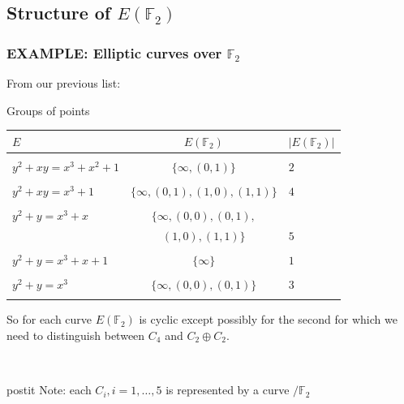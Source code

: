 \documentclass[10pt,handout]{beamer}%
\newcommand{\F}{\mathbb F}
\theoremstyle{definition}
\begin{document}
\subsection{Structure of \texorpdfstring{$E(\F_2)$}{E(F2)}}
\begin{frame}
\frametitle{EXAMPLE: Elliptic curves over $\F_2$}

From our previous list:
\begin{block}{Groups of points}
\begin{tabular}{|l|c|l|}
\hline
 $E$ & $E(\F_2)$ & $|E(\F_2)|$\\
\hline
&&\\
 $y^2+xy=x^3+x^2+1$ & $\{\infty,(0,1)\}$& $2$\\
&&\\
$y^2+xy=x^3+1$ & $\{\infty,(0,1),(1,0),(1,1)\}$ & $4$\\
&&\\
$y^2+y=x^3+x$&$\{\infty,(0,0),(0,1),$ &\\ &$(1,0),(1,1)\}$&$5$\\
&&\\
 $y^2+y=x^3+x+1$ &$\{\infty\}$&$1$\\
&&\\
$y^2+y=x^3$ & $\{\infty,(0,0), (0,1)\}$ & $3$ \\
&&\\\hline
\end{tabular}
\end{block}
\pause
So for each curve $E(\F_2)$ is cyclic except possibly for the second for which we need to distinguish between
$C_4$ and $C_2\oplus C_2$.\pause

\ \hfill \begin{beamercolorbox}[center,wd=9cm]{postit}
Note: each $C_i, i=1,\ldots,5$ is represented by a curve $/\F_2$
            \end{beamercolorbox}
\end{frame}
\end{document}
